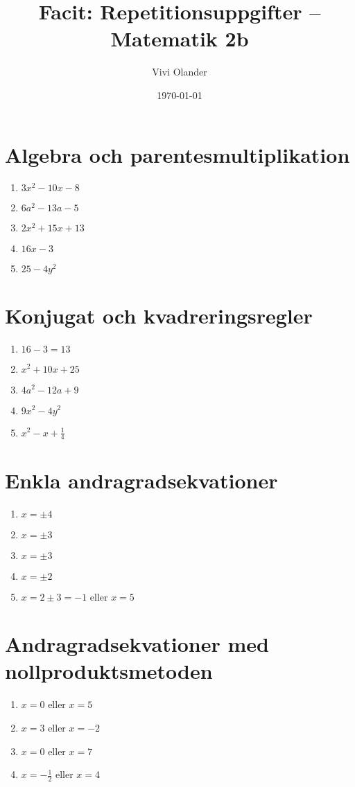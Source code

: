\documentclass[a4paper,11pt]{article}
\title{Facit: Repetitionsuppgifter -- Matematik 2b}
\author{Vivi Olander}
\date{\today}
\begin{document}
\maketitle

\section{Algebra och parentesmultiplikation}
\begin{enumerate}[label=\textbf{\arabic*.}]
    \item $3x^2 - 10x - 8$
    \item $6a^2 - 13a - 5$
    \item $2x^2 + 15x + 13$
    \item $16x - 3$
    \item $25 - 4y^2$
\end{enumerate}

\section{Konjugat och kvadreringsregler}
\begin{enumerate}[label=\textbf{\arabic*.}]
    \item $16 - 3 = 13$
    \item $x^2 + 10x + 25$
    \item $4a^2 - 12a + 9$
    \item $9x^2 - 4y^2$
    \item $x^2 - x + \frac{1}{4}$
\end{enumerate}

\section{Enkla andragradsekvationer}
\begin{enumerate}[label=\textbf{\arabic*.}]
    \item $x = \pm 4$
    \item $x = \pm 3$
    \item $x = \pm 3$
    \item $x = \pm 2$
    \item $x = 2 \pm 3 = -1$ eller $x = 5$
\end{enumerate}

\section{Andragradsekvationer med nollproduktsmetoden}
\begin{enumerate}[label=\textbf{\arabic*.}]
    \item $x = 0$ eller $x = 5$
    \item $x = 3$ eller $x = -2$
    \item $x = 0$ eller $x = 7$
    \item $x = -\frac{1}{2}$ eller $x = 4$
\end{enumerate}
\end{document}
